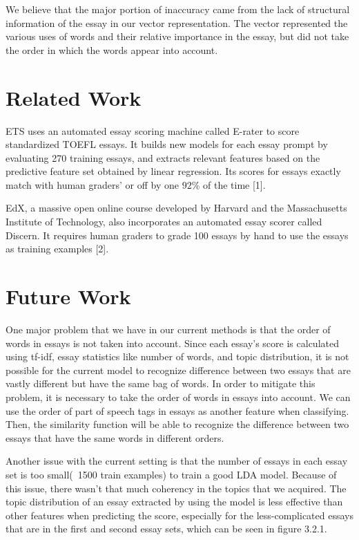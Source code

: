 \documentclass{article}
\begin{document}
We believe that the major portion of inaccuracy came from the lack of structural information of the essay in our vector representation. The vector represented the various uses of words and their relative importance in the essay, but did not take the order in which the words appear into account.

\section{Related Work}
ETS uses an automated essay scoring machine called E-rater to score standardized TOEFL essays. It builds new models for each essay prompt by evaluating 270 training essays, and extracts relevant features based on the predictive feature set obtained by linear regression. Its scores for essays exactly match with human graders’ or off by one $92\%$ of the time [1].

EdX, a massive open online course developed by Harvard and the Massachusetts Institute of Technology, also incorporates an automated essay scorer called Discern. It requires human graders to grade 100 essays by hand to use the essays as training examples [2].

\section{Future Work}
One major problem that we have in our current methods is that the order of words in essays is not taken into account. Since each essay’s score is calculated using tf-idf, essay statistics like number of words, and topic distribution, it is not possible for the current model to recognize difference between two essays that are vastly different but have the same bag of words. In order to mitigate this problem, it is necessary to take the order of words in essays into account. We can use the order of part of speech tags in essays as another feature when classifying. Then, the similarity function will be able to recognize the difference between two essays that have the same words in different orders.

Another issue with the current setting is that the number of essays in each essay set is too small(~1500 train examples) to train a good LDA model. Because of this issue, there wasn’t that much coherency in the topics that we acquired. The topic distribution of an essay extracted by using the model is less effective than other features when predicting the score, especially for the less-complicated essays that are in the first and second essay sets, which can be seen in figure 3.2.1.
\end{document}
